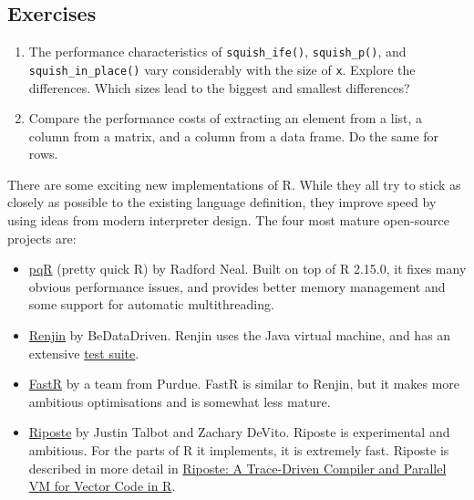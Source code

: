 \subsection{Exercises}

\begin{enumerate}
\def\labelenumi{\arabic{enumi}.}
\item
  The performance characteristics of \texttt{squish\_ife()},
  \texttt{squish\_p()}, and \texttt{squish\_in\_place()} vary
  considerably with the size of \texttt{x}. Explore the differences.
  Which sizes lead to the biggest and smallest differences?
\item
  Compare the performance costs of extracting an element from a list, a
  column from a matrix, and a column from a data frame. Do the same for
  rows.
\end{enumerate}


There are some exciting new implementations of R. While they all try to
stick as closely as possible to the existing language definition, they
improve speed by using ideas from modern interpreter design. The four
most mature open-source projects are:

\begin{itemize}
\item
  \href{http://www.pqr-project.org/}{pqR} (pretty quick R) by Radford
  Neal. Built on top of R 2.15.0, it fixes many obvious performance
  issues, and provides better memory management and some support for
  automatic multithreading. 
\item
  \href{http://www.renjin.org/}{Renjin} by BeDataDriven. Renjin uses the
  Java virtual machine, and has an extensive
  \href{http://packages.renjin.org/}{test suite}. 
\item
  \href{https://github.com/allr/fastr}{FastR} by a team from Purdue.
  FastR is similar to Renjin, but it makes more ambitious optimisations
  and is somewhat less mature. 
\item
  \href{https://github.com/jtalbot/riposte}{Riposte} by Justin Talbot
  and Zachary DeVito. Riposte is experimental and ambitious. For the
  parts of R it implements, it is extremely fast. Riposte is described
  in more detail in
  \href{http://www.justintalbot.com/wp-content/uploads/2012/10/pact080talbot.pdf}{Riposte:
  A Trace-Driven Compiler and Parallel VM for Vector Code in R}.
\end{itemize}

